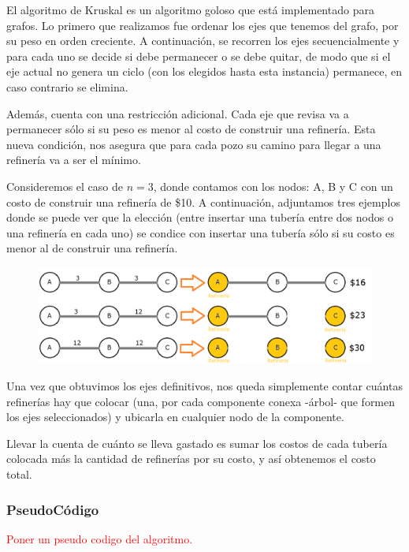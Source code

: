 El algoritmo de Kruskal es un algoritmo goloso que est\'a implementado para grafos. Lo primero que realizamos fue ordenar los ejes que tenemos del grafo, por su peso en orden creciente. A continuaci\'on, se recorren los ejes secuencialmente y para cada uno se decide si debe permanecer o se debe quitar, de modo que si el eje actual no genera un ciclo (con los elegidos hasta esta instancia) permanece, en caso contrario se elimina.

Adem\'as, cuenta con una restricci\'on adicional. Cada eje que revisa va a permanecer s\'olo si su peso es menor al costo de construir una refiner\'ia. Esta nueva condici\'on, nos asegura que para cada pozo su camino para llegar a una refiner\'ia va a ser el m\'inimo. 

Consideremos el caso de $n=3$, donde contamos con los nodos: A, B y C con un costo de construir una refiner\'ia de \$10. A continuaci\'on, adjuntamos tres ejemplos donde se puede ver que la elecci\'on (entre insertar una tuber\'ia entre dos nodos o una refiner\'ia en cada uno) se condice con insertar una tuber\'ia s\'olo si su costo es menor al de construir una refiner\'ia.

  \begin{figure}[h!]
   \begin{center}
 	\includegraphics[scale=0.5]{imagenes/ej3/grafos.png}
   \end{center}
 \end{figure}


	Una vez que obtuvimos los ejes definitivos, nos queda simplemente contar cu\'antas refiner\'ias hay que colocar (una, por cada componente conexa -\'arbol- que formen los ejes seleccionados) y ubicarla en cualquier nodo de la componente.
	
	Llevar la cuenta de cu\'anto se lleva gastado es sumar los costos de cada tuber\'ia colocada m\'as la cantidad de refiner\'ias por su costo, y as\'i obtenemos el costo total.

\subsubsection*{PseudoC\'odigo}
\textcolor{red}{Poner un pseudo codigo del algoritmo.}

